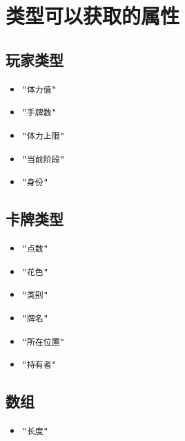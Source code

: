 \chapter{类型可以获取的属性}

\section{玩家类型}

\begin{itemize}
 \item \verb|"体力值"|
 \item \verb|"手牌数"|
 \item \verb|"体力上限"|
 \item \verb|"当前阶段"|
 \item \verb|"身份"|
\end{itemize}

\section{卡牌类型}

\begin{itemize}
 \item \verb|"点数"|
 \item \verb|"花色"|
 \item \verb|"类别"|
 \item \verb|"牌名"|
 \item \verb|"所在位置"|
 \item \verb|"持有者"|
\end{itemize}

\section{数组}

\begin{itemize}
 \item \verb|"长度"|
\end{itemize}
